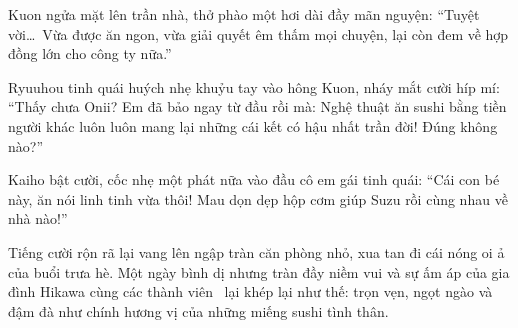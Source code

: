 \documentclass[../main.tex]{subfiles}
\begin{document}
Kuon ngửa mặt lên trần nhà, thở phào một hơi dài đầy mãn nguyện: ``Tuyệt vời\dots\ Vừa được ăn ngon, vừa giải quyết êm thấm mọi chuyện, lại còn đem về hợp đồng lớn cho công ty nữa.''

Ryuuhou tinh quái huých nhẹ khuỷu tay vào hông Kuon, nháy mắt cười híp mí: ``Thấy chưa Onii? Em đã bảo ngay từ đầu rồi mà: Nghệ thuật ăn sushi bằng tiền người khác luôn luôn mang lại những cái kết có hậu nhất trần đời! Đúng không nào?''

Kaiho bật cười, cốc nhẹ một phát nữa vào đầu cô em gái tinh quái: ``Cái con bé này, ăn nói linh tinh vừa thôi! Mau dọn dẹp hộp cơm giúp Suzu rồi cùng nhau về nhà nào!''

Tiếng cười rộn rã lại vang lên ngập tràn căn phòng nhỏ, xua tan đi cái nóng oi ả của buổi trưa hè. Một ngày bình dị nhưng tràn đầy niềm vui và sự ấm áp của gia đình Hikawa cùng các thành viên \hll\ lại khép lại như thế: trọn vẹn, ngọt ngào và đậm đà như chính hương vị của những miếng sushi tình thân.
\end{document}
